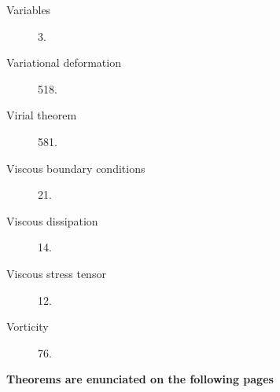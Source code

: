 \begin{small}
\begin{description}
\medskip
\item[Variables] 3.
\item[Variational deformation] 518.
\item[Virial theorem] 581.
\item[Viscous boundary conditions] 21.
\item[Viscous dissipation] 14.
\item[Viscous stress tensor] 12.
\item[Vorticity] 76.

\end{description}

\bigskip

\begin{center}
\textbf{Theorems are enunciated on the following pages}
\end{center}

\medskip


\end{small}
